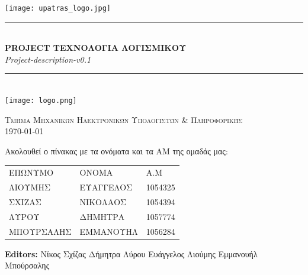 \documentclass[12pt,a4paper,oneside]{article}
\newcommand{\HRule}{\rule{\linewidth}{0.5mm}}
\begin{document}
\renewcommand{\contentsname}{Περιεχόμενα}

\renewcommand{\refname}{Αναφορές}

\begin{titlepage}
\begin{center}

\texttt{[image: upatras\_logo.jpg]}~\\[2cm]


\HRule \\[0.4cm]
{ \LARGE 
  \textbf{PROJECT TΕΧΝΟΛΟΓΙΑ ΛΟΓΙΣΜΙΚΟΥ}\\[0.4cm]
  \emph{Project-description-v0.1}\\[0.4cm]
}
\HRule \\[1.5cm]



{ \large
  \texttt{[image: logo.png]}~\\[2cm]
 
}

\vfill

\textsc{\large Τμήμα Μηχανικών Ηλεκτρονικών Υπολογιστών \& Πληροφορικής}\\[0.4cm]


{\large {}\today}
 
\end{center}
\end{titlepage}
\pagestyle{fancy}
\centering
Ακολουθεί ο πίνακας με τα ονόματα και τα ΑΜ της ομαδάς μας:

\centering
\begin{tabular}{ |p{4cm}|p{4cm}|p{3cm}|}
\arrayrulecolor{gray}
 \hline
 \multicolumn{3}{|c|}{Μέλη} \\
 \hline
 ΕΠΩΝΥΜΟ& ΟΝΟΜΑ & Α.M\\
 \hline
 ΛΙΟΥΜΗΣ   & ΕΥΑΓΓΕΛΟΣ    & 1054325\\
 ΣΧΙΖΑΣ &  ΝΙΚΟΛΑΟΣ & 1054394\\
 ΛΥΡΟΥ & ΔΗΜΗΤΡΑ & 1057774\\
 ΜΠΟΥΡΣΑΛΗΣ   & ΕΜΜΑΝΟΥΗΛ & 1056284\\
\hline 

\end{tabular}


\vspace{7cm}
\raggedright
\textbf{Editors:}
\newline
Νίκος Σχίζας
\newline
Δήμητρα Λύρου
\newline
Ευάγγελος Λιούμης
\newline
Εμμανουήλ Μπούρσαλης
\end{document}
